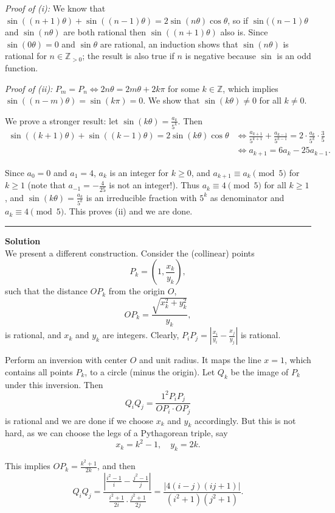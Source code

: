 \documentclass[12pt,oneside,a4paper]{book}
\newcounter{solnum}
\newcommand{\soln}{\stepcounter{solnum}\medskip\hrule\medbreak\textbf{Solution \thesolnum}\\}
\begin{document}
\smallskip
\emph{Proof of (i):} We know that $\sin((n+1)\theta) + \sin((n-1)\theta) = 2\sin(n\theta)\cos\theta$, so if $\sin((n-1)\theta$ and $\sin(n\theta)$ are both rational then $\sin((n+1)\theta)$ also is. Since $\sin(0\theta) = 0$ and $\sin\theta$ are rational, an induction shows that $\sin(n\theta)$ is rational for $n\in\mathbb{Z}_{>0}$; the result is also true if $n$ is negative because $\sin$ is an odd function.

\smallskip
\emph{Proof of (ii):} $P_m=P_n\iff 2n\theta=2m\theta + 2k\pi$ for some $k\in\mathbb{Z}$, which implies $\sin((n-m)\theta) = \sin(k\pi) = 0$. We show that $\sin(k\theta) \ne 0$ for all $k\ne 0$.

We prove a stronger result: let $\sin(k\theta) = \frac{a_k}{5^k}$. Then
\begin{align*}
\sin((k+1)\theta) + \sin((k-1)\theta) = 2\sin(k\theta)\cos\theta
&\iff \frac{a_{k+1}}{5^{k+1}} + \frac{a_{k-1}}{5^{k-1}} = 2\cdot \frac{a_k}{5^k}\cdot \frac35\\
&\iff a_{k+1} = 6a_k - 25a_{k-1}.
\end{align*}

Since $a_0=0$ and $a_1=4$, $a_k$ is an integer for $k\ge 0$, and $a_{k+1} \equiv a_k\pmod 5$ for $k\ge 1$ (note that $a_{-1} = -\frac4{25}$ is not an integer!). Thus $a_k\equiv 4\pmod 5$ for all $k\ge 1$, and $\sin(k\theta) = \frac{a_k}{5^k}$ is an irreducible fraction with $5^k$ as denominator and $a_k\equiv 4\pmod 5$. This proves (ii) and we are done.

\soln
We present a different construction. Consider the (collinear) points
\[P_k = \left(1,\frac{x_k}{y_k}\right),\]
such that the distance $OP_k$ from the origin $O$,
\[OP_k = \frac{\sqrt{x_k^2+y_k^2}}{y_k},\]
is rational, and $x_k$ and $y_k$ are integers. Clearly, $P_iP_j = \left|\frac{x_i}{y_i} - \frac{x_j}{y_j}\right|$ is rational.

Perform an inversion with center $O$ and unit radius. It maps the line $x=1$, which contains all points $P_k$, to a circle (minus the origin). Let $Q_k$ be the image of $P_k$ under this inversion. Then
\[Q_iQ_j = \frac{1^2 P_iP_j}{OP_i\cdot OP_j}\]
is rational and we are done if we choose $x_k$ and $y_k$ accordingly. But this is not hard, as we can choose the legs of a Pythagorean triple, say
\[x_k = k^2-1,\quad y_k=2k.\]

This implies $OP_k = \frac{k^2+1}{2k}$, and then
\[Q_iQ_j = \frac{\left|\frac{i^2-1}i - \frac{j^2-1}j\right|}{\frac{i^2+1}{2i}\cdot\frac{j^2+1}{2j}} = \frac{|4(i-j)(ij+1)|}{(i^2+1)(j^2+1)}.\]
\end{document}
